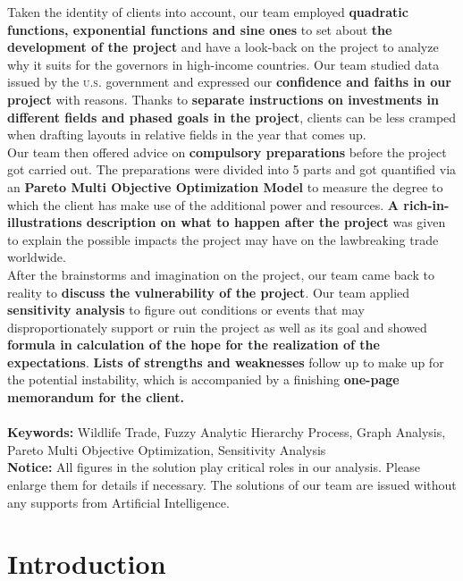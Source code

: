 \documentclass[12pt]{article}
\begin{document}
Taken the identity of clients into account, our team employed \textbf{quadratic functions, exponential functions and sine ones} to set about \textbf{the development of the project} and have a look-back on the project to analyze why it suits for the governors in high-income countries. Our team studied data issued by the \textsc{u.s.} government and expressed our \textbf{confidence and faiths in our project} with reasons. Thanks to \textbf{separate instructions on investments in different fields and phased goals in the project}, clients can be less cramped when drafting layouts in relative fields in the year that comes up.\\

Our team then offered advice on \textbf{compulsory preparations} before the project got carried out. The preparations were divided into 5 parts and got quantified via an \textbf{Pareto Multi Objective Optimization Model} to measure the degree to which the client has make use of the additional power and resources. \textbf{A rich-in-illustrations description on what to happen after the project} was given to explain the possible impacts the project may have on the lawbreaking trade worldwide.\\

After the brainstorms and imagination on the project, our team came back to reality to \textbf{discuss the vulnerability of the project}. Our team applied \textbf{sensitivity analysis} to figure out conditions or events that may disproportionately support or ruin the project as well as its goal and showed \textbf{formula in calculation of the hope for the realization of the expectations}. \textbf{Lists of strengths and weaknesses} follow up to make up for the potential instability, which is accompanied by a finishing \textbf{one-page memorandum for the client.}
\\\\
\textbf{Keywords:} Wildlife Trade, Fuzzy Analytic Hierarchy Process, Graph Analysis, Pareto Multi Objective Optimization, Sensitivity Analysis
\clearpage
\pagestyle{fancy}
\newpage
\setcounter{page}{1}
\tableofcontents
{\textbf{}}\\[2ex]
{\textbf{Notice:} All figures in the solution play critical roles in our analysis. Please enlarge them for details if necessary. The solutions of our team are issued without any supports from Artificial Intelligence.}
\clearpage
\section{Introduction}
\end{document}
